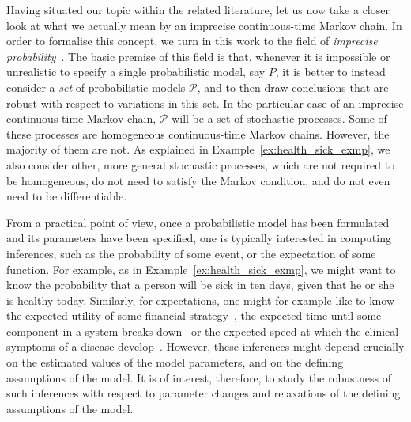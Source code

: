 \documentclass[10pt,a4paper]{paper}
\theoremstyle{definition}
\begin{document}
Having situated our topic within the related literature, let us now take a closer look at what we actually mean by an imprecise continuous-time Markov chain.
In order to formalise this concept, we turn in this work to the field of \emph{imprecise probability}~\cite{Walley:1991vk,troffaes2013:lp,augustin2013:itip}. The basic premise of this field is that, whenever it is impossible or unrealistic to specify a single probabilistic model, say $P$, it is better to instead consider a \emph{set} of probabilistic models $\mathcal{P}$, and to then draw conclusions that are robust with respect to variations in this set. In the particular case of an imprecise continuous-time Markov chain, $\mathcal{P}$ will be a set of stochastic processes. Some of these processes are homogeneous continuous-time Markov chains. However, the majority of them are not. As explained in Example~\ref{ex:health_sick_exmp}, we also consider other, more general stochastic processes, which are not required to be homogeneous, do not need to satisfy the Markov condition, and do not even need to be differentiable.


From a practical point of view, once a probabilistic model has been formulated and its parameters have been specified, one is typically interested in computing inferences, such as the probability of some event, or the expectation of some function. For example, as in Example~\ref{ex:health_sick_exmp}, we might want to know the probability that a person will be sick in ten days, given that he or she is healthy today.
Similarly, for expectations, one might for example like to know the expected utility of some financial strategy~\cite{sass2004optimizing}, the expected time until some component in a system breaks down~\cite{besnard2010approach} or the expected speed at which the clinical symptoms of a disease develop~\cite{duffy1995estimation}. However, these inferences might depend crucially on the estimated values of the model parameters, and on the defining assumptions of the model.
It is of interest, therefore, to study the robustness of such inferences with respect to parameter changes and relaxations of the defining assumptions of the model.
\end{document}
